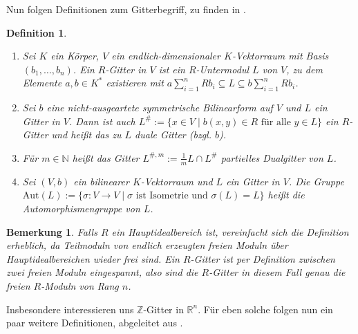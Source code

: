 \documentclass[12pt,a4paper,halfparskip,headsepline,bibtotocnumbered]{scrreprt}
\theoremstyle{nummermitklammern}
\newtheorem{definition}[defsatzusw]{Definition}
\newtheorem{bemerkung}[defsatzusw]{Bemerkung}
\theoremstyle{nonumberbreak}
\newcommand{\N}{\mathbb{N}}
\newcommand{\Z}{\mathbb{Z}}
\newcommand{\R}{\mathbb{R}}
\newcommand{\Aut}{\text{Aut}}
\begin{document}
Nun folgen Definitionen zum Gitterbegriff, zu finden in \cite[Def. (14.1), (14.2)]{kneser}.
\begin{framed}
	\begin{definition}
		\begin{enumerate}[label=(\roman*)]
			\item Sei $K$ ein Körper, $V$ ein endlich-dimensionaler $K$-Vektorraum mit Basis $(b_1,\dots,b_n)$. Ein $R$-Gitter in $V$ ist ein $R$-Untermodul $L$ von $V$, zu dem Elemente $a,b \in K^*$ existieren mit $a \sum_{i=1}^n R b_i \subseteq L \subseteq b \sum_{i=1}^n R b_i$.
			\item Sei $b$ eine nicht-ausgeartete symmetrische Bilinearform auf $V$ und $L$ ein Gitter in $V$. Dann ist auch $L^\# := \lbrace x \in V \mid b(x,y) \in R \text{ für alle } y \in L \rbrace$ ein $R$-Gitter und heißt \textit{das zu $L$ duale Gitter} (bzgl. $b$).
			\item Für $m \in \N$ heißt das Gitter $L^{\#,m} := \frac{1}{m}L \cap L^\#$ \textit{partielles Dualgitter} von $L$.
			\item Sei $(V,b)$ ein bilinearer $K$-Vektorraum und $L$ ein Gitter in $V$. Die Gruppe $\Aut(L) := \lbrace \sigma : V \rightarrow V \mid \sigma \text{ ist Isometrie und } \sigma(L) = L \rbrace$ heißt die \textit{Automorphismengruppe} von $L$.
		\end{enumerate}
	\end{definition}
\end{framed}

\begin{bemerkung}
	Falls $R$ ein Hauptidealbereich ist, vereinfacht sich die Definition erheblich, da Teilmoduln von endlich erzeugten freien Moduln über Hauptidealbereichen wieder frei sind. Ein $R$-Gitter ist per Definition zwischen zwei freien Moduln eingespannt, also sind die $R$-Gitter in diesem Fall genau die freien $R$-Moduln von Rang $n$.
\end{bemerkung}

Insbesondere interessieren uns $\Z$-Gitter in $\R^n$. Für eben solche folgen nun ein paar weitere Definitionen, abgeleitet aus \cite[Def. (1.7), (1.13), (14.7), (26.1)]{kneser}.
\end{document}
